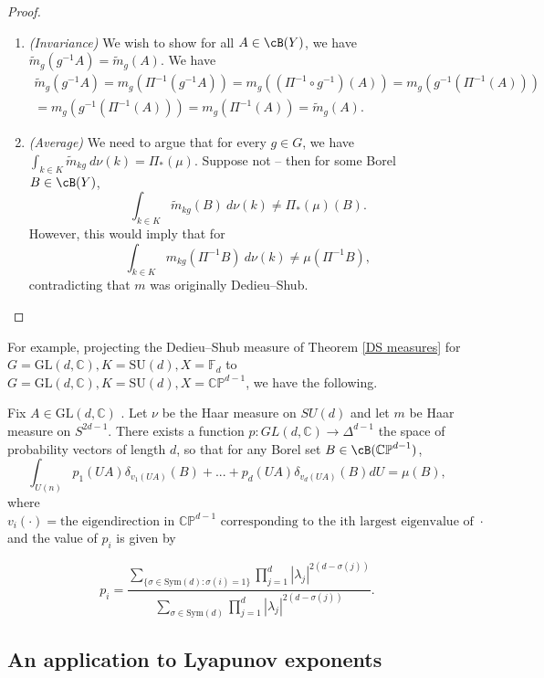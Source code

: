 \documentclass[10pt]{amsart}
\numberwithin{equation}{section}     %
\newcommand{\C}{\mathbb{C}}
\newcommand{\CP}{\mathbb{CP}}
\newcommand{\FF}{\mathbb{F}}
\newcommand{\GL}{\mathrm{GL}}
\newcommand{\SU}{\mathrm{SU}}
\begin{document}
\begin{proof}$ $

    \begin{enumerate}
        \item[1.] \textit{(Invariance)} We wish to show for all $A \in \cB(Y)$, we have $\tilde{m}_g(g^{-1}A) = \tilde{m}_g(A)$. We have \begin{align*}
            \tilde{m}_g(g^{-1}A) = m_g(\Pi^{-1}(g^{-1}A)) = m_g((\Pi^{-1} \circ g^{-1})(A)) = m_g(g^{-1}(\Pi^{-1}(A))) \\
            = m_g(g^{-1}(\Pi^{-1}(A))) = m_g(\Pi^{-1}(A)) = \tilde{m}_g(A). 
        \end{align*}
        \item[2.] \textit{(Average)} We need to argue that for every $g \in G$, we have $\int_{k \in K} \tilde{m}_{kg} \ d\nu(k) = \Pi_*(\mu)$. Suppose not -- then for some Borel $B \in \cB(Y)$, $$\int_{k \in K} \tilde{m}_{kg}(B) \ d\nu(k) \neq \Pi_*(\mu)(B).$$ However, this would imply that for $$\int_{k \in K} m_{kg}(\Pi^{-1}B) \ d\nu(k) \neq \mu(\Pi^{-1} B),$$ contradicting that $m$ was originally Dedieu--Shub. 
    \end{enumerate}

\end{proof}

For example, projecting the Dedieu--Shub measure of Theorem \ref{DS measures} for $G = \GL(d,\C), K = \SU(d), X = \FF_d$ to  $G = \GL(d,\C), K = \SU(d), X =\CP^{d-1}$, we have the following. 


\begin{corollary}[Projecting Theorem \ref{DS measures} to $\CP^{d-1}$] \label{CPmeasure}
    Fix $A \in \GL(d,\C)$ . Let $\nu$ be the Haar measure on $SU(d)$ and let $m$ be Haar measure on $S^{2d-1}$. There exists a function $p:GL(d,\C) \to \Delta^{d-1}$ the space of probability vectors of length $d$, so that for any Borel set $B \in \cB(\CP^{d-1})$, $$\int_{U(n)}  p_1(UA)\delta_{v_1(UA)} (B) + ... + p_d(UA)\delta_{v_d(UA)}(B) dU = \mu(B),$$ where $v_i(\cdot) = \text{the eigendirection in } \CP^{d-1} \text{ corresponding to the ith largest eigenvalue of }  \cdot$ and the value of $p_i$ is given by 

    $$p_i = \frac{\sum \limits_{\{\sigma \in \text{Sym}(d): \sigma(i) =  1\}} \prod \limits_{j = 1}^d |\lambda_j|^{2(d - \sigma(j))}}{\sum \limits_{\sigma \in \text{Sym}(d)} \prod \limits_{j=1}^d  |\lambda_j|^{2(d-\sigma(j))}}.$$
\end{corollary}

\subsection{An application to Lyapunov exponents} \label{definititiondef}
\end{document}
